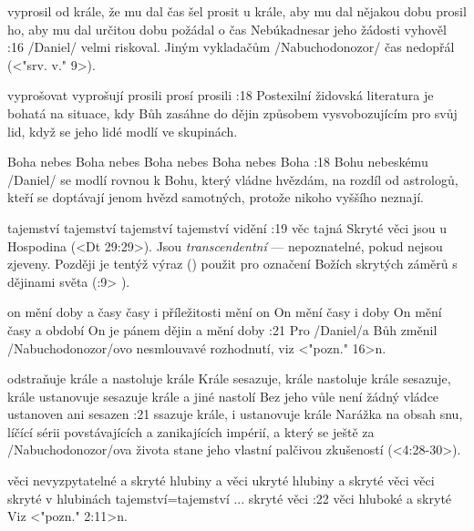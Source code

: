     {vyprosil od krále, že mu dal čas} %
    {šel prosit u krále, aby mu dal nějakou dobu}  %
    {prosil ho, aby mu dal určitou dobu} %
    {požádal o čas}  %
    {Nebúkadnesar jeho žádosti vyhověl}  %
:16 {}  \x/Daniel/ velmi riskoval. Jiným vykladačům \x/Nabuchodonozor/ čas nedopřál (<"srv. v." 9>).

    {vyprošovat} %
    {vyprošují}  %
    {prosili} %
    {prosí}  %
    {prosili}  %
:18 {}  Postexilní židovská literatura je bohatá na situace, kdy Bůh zasáhne do dějin způsobem vysvobozujícím pro svůj lid, když se jeho lidé modlí ve skupinách.


    {Boha nebes} %
    {Boha nebes}  %
    {Boha nebes} %
    {Boha nebes}  %
    {Boha}  %
:18 {Bohu nebeskému} \x/Daniel/ se modlí rovnou k Bohu, který vládne hvězdám, na rozdíl od astrologů, kteří se doptávají jenom hvězd samotných, protože nikoho vyššího neznají.


    {tajemství} %
    {tajemství}  %
    {tajemství} %
    {tajemství}  %
    {vidění}  %
:19 {věc tajná} Skryté věci jsou u Hospodina (<Dt 29:29>). Jsou {\em transcendentní} --- nepoznatelné, pokud nejsou zjeveny. Později je tentýž výraz (\Raza) použit pro označení Božích skrytých záměrů s dějinami světa (:9> \Raz). 

    {on mění doby a časy} %
    {časy i příležitosti mění on}  %
    {On mění časy i doby} %
    {On mění časy a období}  %
    {On je pánem dějin a mění doby}  %
:21 {} Pro \x/Daniel/a Bůh změnil \x/Nabuchodonozor/ovo nesmlouvavé rozhodnutí, 
viz <"pozn." 16>n. 


    {odstraňuje krále a nastoluje krále} %
    {Krále sesazuje, krále nastoluje}  %
    {krále sesazuje, krále ustanovuje} %
    {sesazuje krále a jiné nastolí}  %
    {Bez jeho vůle není žádný vládce ustanoven ani sesazen}  %
:21 {ssazuje krále, i ustanovuje krále} Narážka na obsah snu, líčící sérii povstávajících a zanikajících impérií, a který se ještě za \x/Nabuchodonozor/ova života stane jeho vlastní palčivou zkušeností (<4:28-30>). 

    {věci nevyzpytatelné a skryté} %
    {hlubiny a věci ukryté}  %
    {hlubiny a skryté věci} %
    {věci skryté v hlubinách}  %
    {tajemství}={tajemství ... skryté věci}  %
:22 {věci hluboké a skryté} Viz <"pozn." 2:11>n. 

